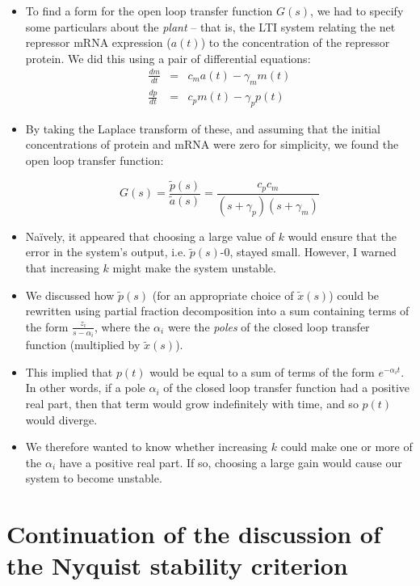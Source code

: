 \documentclass{article}
\begin{document}
\begin{itemize}
\item To find a form for the open loop transfer function $G(s)$, we had to specify some particulars about the \textit{plant} -- that is, the LTI system relating the net repressor mRNA expression ($a(t)$) to the concentration of the repressor protein. We did this using a pair of differential equations:
\begin{eqnarray*}
\frac{dm}{dt} & = & c_m a(t) - \gamma_m m(t)\\
\frac{dp}{dt} & = & c_p m(t) - \gamma_p p(t)
\end{eqnarray*}

\item By taking the Laplace transform of these, and assuming that the initial concentrations of protein and mRNA were zero for simplicity, we found the open loop transfer function:

\[ G(s) = \frac{\tilde{p}(s)}{\tilde{a}(s)} = \frac{c_p c_m}{\left( s + \gamma_p \right)\left( s + \gamma_m \right)} \]

\item Na\"{i}vely, it appeared that choosing a large value of $k$ would ensure that the error in the system's output, i.e. $\tilde{p}(s)$-0, stayed small. However, I warned that increasing $k$ might make the system unstable.

\item We discussed how $\tilde{p}(s)$ (for an appropriate choice of $\tilde{x}(s)$) could be rewritten using partial fraction decomposition into a sum containing terms of the form $\frac{z_i}{s-\alpha_i}$, where the $\alpha_i$ were the \textit{poles} of the closed loop transfer function (multiplied by $\tilde{x}(s)$).

\item This implied that $p(t)$ would be equal to a sum of terms of the form $e^{-\alpha_i t}$. In other words, if a pole $\alpha_i$ of the closed loop transfer function had a positive real part, then that term would grow indefinitely with time, and so $p(t)$ would diverge.

\item We therefore wanted to know whether increasing $k$ could make one or more of the $\alpha_i$ have a positive real part. If so, choosing a large gain would cause our system to become unstable.

\end{itemize}

\section*{Continuation of the discussion of the Nyquist stability criterion}
\end{document}
